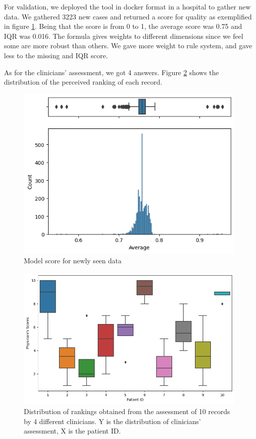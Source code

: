 For validation, we deployed the tool in docker format in a hospital to gather new data. We gathered 3223 new cases and returned a score for quality as exemplified in figure \ref{fig:scores}. Being that the score is from 0 to 1, the average score was 0.75 and IQR was 0.016. The formula gives weights to different dimensions since we feel some are more robust than others. We gave more weight to rule system, and gave less to the missing and IQR score.

As for the clinicians' assessment, we got 4 answers. Figure \ref{fig:clinical} shows the distribution of the perceived ranking of each record.


\begin{figure}[htbp]
\centering
\caption{Model score for newly seen data}\label{fig:scores} 
\includegraphics[scale=0.78]{figures/Scoring_V2.png}
\end{figure}

\begin{figure}[htbp]
\centering
\caption{Distribution of rankings obtained from the assessment of 10 records by 4 different clinicians. Y is the distribution of clinicians' assessment, X is the patient ID.}\label{fig:clinical} 
\includegraphics[scale=0.52]{figures/clinical_assessment_no_model.png}
\end{figure}

